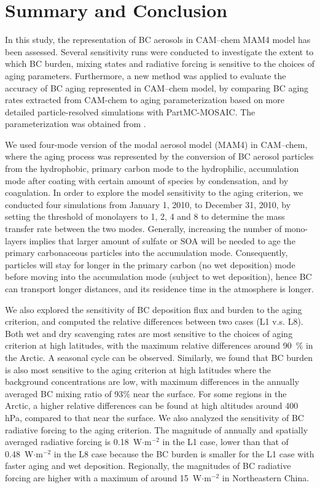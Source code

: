 \documentclass[12pt, fullpage]{uiucthesis2009_2}
\begin{document}
	
	\chapter{Summary and Conclusion}
		In this study, the representation of BC aerosols in CAM--chem MAM4 model has been assessed. Several sensitivity runs were conducted to investigate the extent to which BC burden, mixing states and radiative forcing is sensitive to the choices of aging parameters. Furthermore, a new method was applied to evaluate the accuracy of BC aging represented in CAM--chem model, by comparing BC aging rates extracted from CAM-chem to aging parameterization based on more detailed particle-resolved simulations with PartMC-MOSAIC. The parameterization was obtained from \citet{Fierce2016}. 
		
		We used four-mode version of the modal aerosol model (MAM4) in CAM--chem, where the aging process was represented by the conversion of BC aerosol particles from the hydrophobic, primary carbon mode to the hydrophilic, accumulation mode after coating with certain amount of species by condensation, and by coagulation. In order to explore the model sensitivity to the aging criterion, we conducted four simulations from January 1, 2010, to December 31, 2010, by setting the threshold of monolayers to 1, 2, 4 and 8 to determine the mass transfer rate between the two modes. Generally, increasing the number of mono-layers implies that larger amount of sulfate or SOA will be needed to age the primary carbonaceous particles into the accumulation mode. Consequently, particles will stay for longer in the primary carbon (no wet deposition) mode before moving into the accumulation mode (subject to wet deposition), hence BC can transport longer distances, and its residence time in the atmosphere is longer. 
		
		We also explored the sensitivity of BC deposition flux and burden to the aging criterion, and computed the relative differences between two cases (L1 v.s. L8). Both wet and dry scavenging rates are most sensitive to the choices of aging criterion at high latitudes, with the maximum relative differences around 90~$\%$ in the Arctic. A seasonal cycle can be observed. Similarly, we found that BC burden is also most sensitive to the aging criterion at high latitudes where the background concentrations are low, with maximum differences in the annually averaged BC mixing ratio of 93$\%$ near the surface. For some regions in the Arctic, a higher relative differences can be found at high altitudes around 400 hPa, compared to that near the surface. We also analyzed the sensitivity of BC radiative forcing to the aging criterion. The magnitude of annually and spatially averaged radiative forcing is 0.18~W$\cdot{\text{m}^{-2}}$ in the L1 case, lower than that of 0.48~W$\cdot{\text{m}^{-2}}$ in the L8 case because the BC burden is smaller for the L1 case with faster aging and wet deposition. Regionally, the magnitudes of BC radiative forcing are higher with a maximum of around 15~W$\cdot{\text{m}^{-2}}$ in Northeastern China. 
\end{document}
